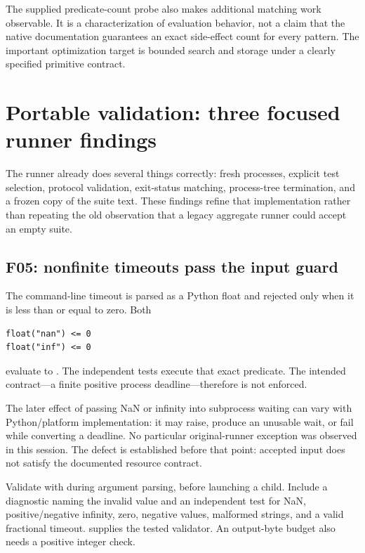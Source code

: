 \documentclass[11pt,letterpaper]{article}
\newcommand{\code}[1]{\texttt{\detokenize{#1}}}
\begin{document}
The supplied predicate-count probe also makes additional matching work observable. It is a characterization of evaluation behavior, not a claim that the native documentation guarantees an exact side-effect count for every pattern. The important optimization target is bounded search and storage under a clearly specified primitive contract.

\section{Portable validation: three focused runner findings}\label{sec:runner}

The runner already does several things correctly: fresh processes, explicit test selection, protocol validation, exit-status matching, process-tree termination, and a frozen copy of the suite text. These findings refine that implementation rather than repeating the old observation that a legacy aggregate runner could accept an empty suite.\cite{portable-runner,portable-tests,review-status}

\subsection{F05: nonfinite timeouts pass the input guard}

The command-line timeout is parsed as a Python float and rejected only when it is less than or equal to zero. Both
\begin{lstlisting}
float("nan") <= 0
float("inf") <= 0
\end{lstlisting}
evaluate to \code{False}. The independent tests execute that exact predicate. The intended contract---a finite positive process deadline---therefore is not enforced.\cite{portable-runner}

The later effect of passing NaN or infinity into subprocess waiting can vary with Python/platform implementation: it may raise, produce an unusable wait, or fail while converting a deadline. No particular original-runner exception was observed in this session. The defect is established before that point: accepted input does not satisfy the documented resource contract.

Validate with \code{math.isfinite(value) and value > 0} during argument parsing, before launching a child. Include a diagnostic naming the invalid value and an independent test for NaN, positive/negative infinity, zero, negative values, malformed strings, and a valid fractional timeout.  supplies the tested validator. An output-byte budget also needs a positive integer check.
\end{document}

